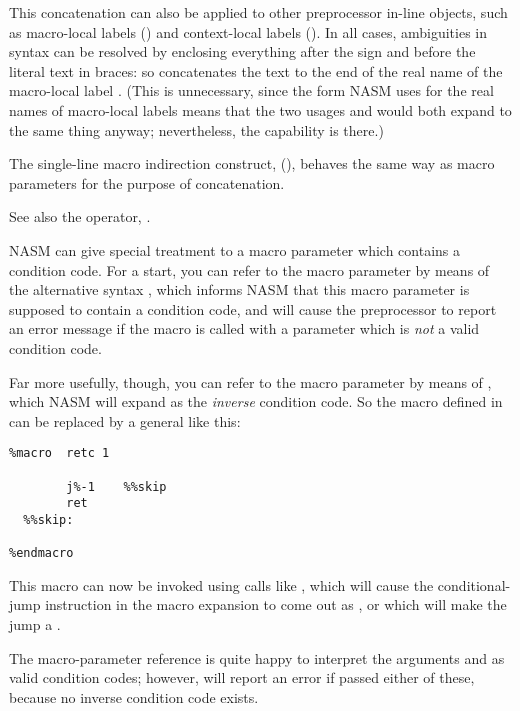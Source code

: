 This concatenation can also be applied to other preprocessor in-line
objects, such as macro-local labels ()
and context-local labels ().
In all cases, ambiguities in syntax can be resolved by enclosing
everything after the \code{\%} sign and before the literal text
in braces: so  concatenates the text 
to the end of the real name of the macro-local label .
(This is unnecessary, since the form NASM uses for the real names of
macro-local labels means that the two usages 
and  would both expand to the same
thing anyway; nevertheless, the capability is there.)

The single-line macro indirection construct, \code{\%[...]}
(), behaves the same way as macro
parameters for the purpose of concatenation.

See also the \code{\%+} operator, .


NASM can give special treatment to a macro parameter which contains
a condition code. For a start, you can refer to the macro parameter
 by means of the alternative syntax ,
which informs NASM that this macro parameter is supposed to contain
a condition code, and will cause the preprocessor to report an
error message if the macro is called with a parameter which is
\emph{not} a valid condition code.

Far more usefully, though, you can refer to the macro parameter by
means of , which NASM will expand as the \emph{inverse}
condition code. So the  macro defined in 
can be replaced by a general  like this:

\begin{lstlisting}
%macro  retc 1

        j%-1    %%skip
        ret
  %%skip:

%endmacro
\end{lstlisting}

This macro can now be invoked using calls like , which
will cause the conditional-jump instruction in the macro expansion
to come out as , or  which will make the jump a
.

The  macro-parameter reference is quite happy to interpret
the arguments  and  as valid condition codes;
however,  will report an error if passed either of these,
because no inverse condition code exists.

